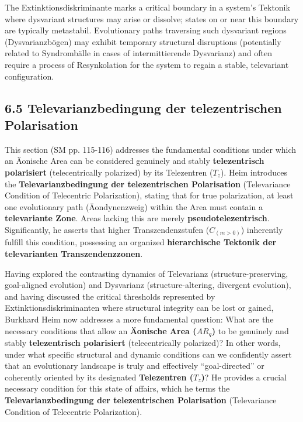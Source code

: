 \documentclass[12pt]{article}
\newcommand{\q}[1]{\enquote{#1}}
\newcommand{\telezentrum}{T_z}
\newcommand{\aeonischearea}{AR_q}
\begin{document}
The Extinktionsdiskriminante marks a critical boundary in a system's Tektonik where dysvariant structures may arise or dissolve; states on or near this boundary are typically metastabil. Evolutionary paths traversing such dysvariant regions (Dysvarianzbögen) may exhibit temporary structural disruptions (potentially related to Syndrombälle in cases of intermittierende Dysvarianz) and often require a process of Resynkolation for the system to regain a stable, televariant configuration.

\subsection{6.5 Televarianzbedingung der telezentrischen Polarisation}
\label{sec:televarianzbedingung}

This section (SM pp. 115-116) addresses the fundamental conditions under which an Äonische Area can be considered genuinely and stably \textbf{telezentrisch polarisiert} (telecentrically polarized) by its Telezentren (\(\telezentrum\)). Heim introduces the \textbf{Televarianzbedingung der telezentrischen Polarisation} (Televariance Condition of Telecentric Polarization), stating that for true polarization, at least one evolutionary path (Äondynenzweig) within the Area must contain a \textbf{televariante Zone}. Areas lacking this are merely \textbf{pseudotelezentrisch}. Significantly, he asserts that higher Transzendenzstufen (\(C_{(m>0)}\)) inherently fulfill this condition, possessing an organized \textbf{hierarchische Tektonik der televarianten Transzendenzzonen}.

Having explored the contrasting dynamics of Televarianz (structure-preserving, goal-aligned evolution) and Dysvarianz (structure-altering, divergent evolution), and having discussed the critical thresholds represented by Extinktionsdiskriminanten where structural integrity can be lost or gained, Burkhard Heim now addresses a more fundamental question: What are the necessary conditions that allow an \textbf{Äonische Area (\(\aeonischearea\))} to be genuinely and stably \textbf{telezentrisch polarisiert} (telecentrically polarized)? In other words, under what specific structural and dynamic conditions can we confidently assert that an evolutionary landscape is truly and effectively \q{goal-directed} or coherently oriented by its designated \textbf{Telezentren (\( \telezentrum \))}? He provides a crucial necessary condition for this state of affairs, which he terms the \textbf{Televarianzbedingung der telezentrischen Polarisation} (Televariance Condition of Telecentric Polarization).
\end{document}
